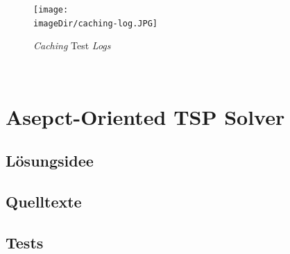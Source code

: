 \documentclass[11pt, a4paper, twoside]{article}   	%
\newcommand{\imageDir}{images}
\begin{document}
\begin{figure}[h]
	\centering
	\texttt{[image: \\imageDir/caching-log.JPG]}
	\caption{\emph{Caching} Test \emph{Logs}}
	\label{fig:caching-log}
\end{figure}
\ \newpage

\section{Asepct-Oriented TSP Solver}
\subsection{Lösungsidee}
\subsection{Quelltexte}
\subsection{Tests}
\end{document}

